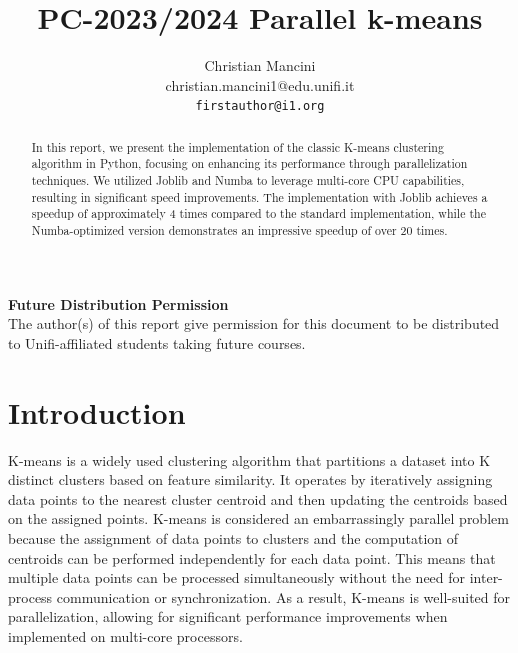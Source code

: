 \documentclass[10pt,twocolumn,letterpaper]{article}
\begin{document}
\title{PC-2023/2024 Parallel k-means}

\author{Christian Mancini\\
christian.mancini1@edu.unifi.it\\
{\tt\small firstauthor@i1.org}
}

\maketitle
\thispagestyle{empty}

\begin{abstract}
	In this report, we present the implementation of the classic K-means clustering algorithm in Python, focusing on enhancing its performance through parallelization techniques. We utilized Joblib \cite{Joblib} and Numba \cite{Numba} to leverage multi-core CPU capabilities, resulting in significant speed improvements. The implementation with Joblib achieves a speedup of approximately 4 times compared to the standard implementation, while the Numba-optimized version demonstrates an impressive speedup of over 20 times.
\end{abstract}

\noindent\large\textbf{Future Distribution Permission}\\
\indent The author(s) of this report give permission for this document to be distributed to Unifi-affiliated students taking future courses.

\section{Introduction}
K-means is a widely used clustering algorithm that partitions a dataset into K distinct clusters based on feature similarity. It operates by iteratively assigning data points to the nearest cluster centroid and then updating the centroids based on the assigned points.
K-means is considered an embarrassingly parallel problem because the assignment of data points to clusters and the computation of centroids can be performed independently for each data point. This means that multiple data points can be processed simultaneously without the need for inter-process communication or synchronization. As a result, K-means is well-suited for parallelization, allowing for significant performance improvements when implemented on multi-core processors.

\end{document}
